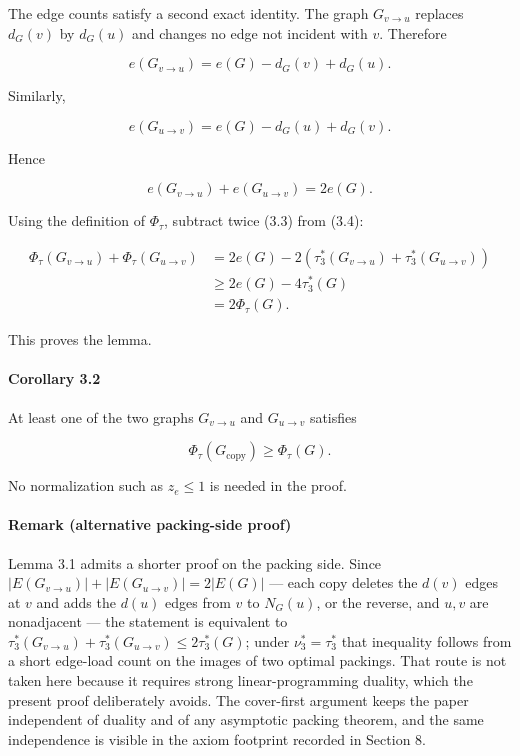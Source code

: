 \documentclass[english,11pt,a4paper]{article}
\begin{document}
The edge counts satisfy a second exact identity. The graph
\(G_{v\to u}\) replaces \(d_G(v)\) by \(d_G(u)\) and changes no edge not
incident with \(v\). Therefore

\[
e(G_{v\to u})
=
e(G)-d_G(v)+d_G(u).
\]

Similarly,

\[
e(G_{u\to v})
=
e(G)-d_G(u)+d_G(v).
\]

Hence

\[
e(G_{v\to u})+e(G_{u\to v})=2e(G).
\tag{3.4}
\]

Using the definition of \(\Phi_\tau\), subtract twice (3.3) from (3.4):

\[
\begin{aligned}
\Phi_\tau(G_{v\to u})
+
\Phi_\tau(G_{u\to v})
&=
2e(G)
-
2\left(
\tau_3^*(G_{v\to u})
+
\tau_3^*(G_{u\to v})
\right)\\
&\ge
2e(G)-4\tau_3^*(G)\\
&=
2\Phi_\tau(G).
\end{aligned}
\]

This proves the lemma.

\paragraph{Corollary 3.2}\label{corollary-3.2}

At least one of the two graphs \(G_{v\to u}\) and \(G_{u\to v}\)
satisfies

\[
\Phi_\tau(G_{\mathrm{copy}})\ge\Phi_\tau(G).
\]

No normalization such as \(z_e\le1\) is needed in the proof.

\paragraph{Remark (alternative packing-side
proof)}\label{remark-alternative-packing-side-proof}

Lemma 3.1 admits a shorter proof on the packing side. Since
\(|E(G_{v\to u})|+|E(G_{u\to v})|=2|E(G)|\) --- each copy deletes the
\(d(v)\) edges at \(v\) and adds the \(d(u)\) edges from \(v\) to
\(N_G(u)\), or the reverse, and \(u,v\) are nonadjacent --- the
statement is equivalent to
\(\tau_3^*(G_{v\to u})+\tau_3^*(G_{u\to v})\le2\tau_3^*(G)\); under
\(\nu_3^*=\tau_3^*\) that inequality follows from a short edge-load
count on the images of two optimal packings. That route is not taken
here because it requires strong linear-programming duality, which the
present proof deliberately avoids. The cover-first argument keeps the
paper independent of duality and of any asymptotic packing theorem, and
the same independence is visible in the axiom footprint recorded in
Section 8.
\end{document}
